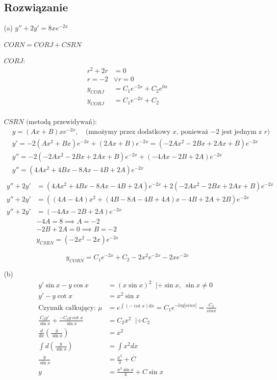 \documentclass[12pt]{article}
\begin{document}
\subsection{Rozwiązanie}
(a) $y''+2y' = 8xe^{-2x}$

$CORN = CORJ + CSRN$

$CORJ:$
\begin{align*}
    r^2 + 2r &= 0 \\
    r = -2 &\lor r = 0 \\
    y_{CORJ} &= C_1 e^{-2x} + C_2 e^{0x} \\
    y_{CORJ} &= C_1 e^{-2x} + C_2 \\
\end{align*}

$CSRN \text{ (metodą przewidywań)}:$
\begin{align*}
    &y = (Ax + B)xe^{-2x}, \quad \text{(mnożymy przez dodatkowy $x$, ponieważ $-2$ jest jednym z $r$)} \\
    &y' = -2(Ax^2+Bx)e^{-2x} + (2Ax+B)e^{-2x} = (-2Ax^2-2Bx+2Ax+B)e^{-2x} \\
    &y'' = -2(-2Ax^2-2Bx+2Ax+B)e^{-2x} + (-4Ax-2B+2A)e^{-2x} \\
    &y'' = (4Ax^2+4Bx-8Ax-4B+2A)e^{-2x} \\
\end{align*}
\begin{align*}
    y''+2y' &= (4Ax^2+4Bx-8Ax-4B+2A)e^{-2x} + 2(-2Ax^2-2Bx+2Ax+B)e^{-2x} \\
    y''+2y' &= ((4A-4A)x^2+(4B-8A-4B+4A)x-4B+2A+2B)e^{-2x} \\
    y''+2y' &= (-4Ax-2B+2A)e^{-2x} \\
    &-4A = 8 \implies A=-2 \\
    &-2B+2A=0 \implies B=-2 \\
    &y_{CSRN} = (-2x^2-2x)e^{-2x}
\end{align*}

\[y_{CORN} = C_1 e^{-2x} + C_2 -2x^2e^{-2x} -2xe^{-2x} \]

(b) 
\begin{align*}
    y' \sin x - y \cos x &= (x \sin x)^2 \;\; | \div \sin x, \; \sin x \neq 0\\
    y'  - y \cot x &= x^2 \sin x \\
    \text{Czynnik całkujący: } \mu &= e^{\int (-\cot x) dx} = C_1 e^{-log|sinx|} = \frac{C_2}{sinx} \\
    \frac{C_2y'}{\sin x} + \frac{- C_2 y \cot x }{\sin x} &= C_2 x^2 \;\; | \div C_2 \\
    \frac{d}{dx} \left( \frac{y}{\sin x} \right) &= x^2 \\
    \int d \left( \frac{y}{\sin x} \right) &= \int x^2 dx \\
    \frac{y}{\sin x} &= \frac{x^3}{3} + C \\
    y &= \frac{x^3\sin x}{3} + C\sin x
\end{align*}
\end{document}
